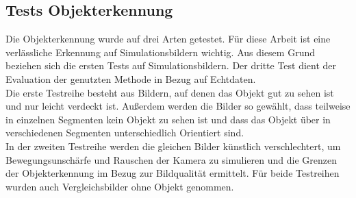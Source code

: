 \subsection{Tests Objekterkennung}
\label{sec_testObj}
Die Objekterkennung wurde auf drei Arten getestet. Für diese Arbeit ist eine verlässliche Erkennung auf Simulationsbildern wichtig. Aus diesem Grund beziehen sich die ersten Tests auf Simulationsbildern. Der dritte Test dient der Evaluation der genutzten Methode in Bezug auf Echtdaten.\\
Die erste Testreihe besteht aus Bildern, auf denen das Objekt gut zu sehen ist und nur leicht verdeckt ist. Außerdem werden die Bilder so gewählt, dass teilweise in einzelnen Segmenten kein Objekt zu sehen ist und dass das Objekt über in verschiedenen Segmenten unterschiedlich Orientiert sind.\\
In der zweiten Testreihe werden die gleichen Bilder künstlich verschlechtert, um Bewegungsunschärfe und Rauschen der Kamera zu simulieren und die Grenzen der Objekterkennung im Bezug zur Bildqualität ermittelt. Für beide Testreihen wurden auch Vergleichsbilder ohne Objekt genommen.
